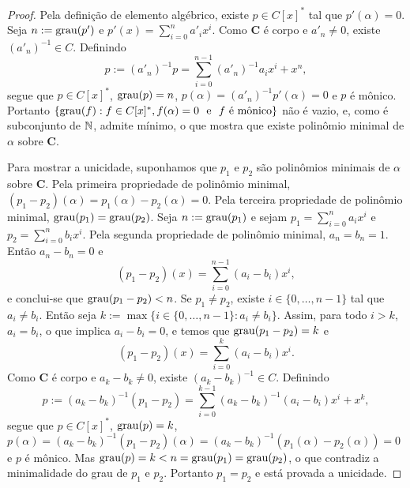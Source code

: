 \begin{proof}
	Pela definição de elemento algébrico, existe $p \in C[x]^*$ tal que $p'(\alpha)=0$. Seja $n := \operatorname{grau}(p')$ e $p'(x) = \sum_{i=0}^n a'_ix^i$. Como $\bm C$ é corpo e $a'_n \neq 0$, existe $(a'_n)^{-1} \in C$. Definindo
	\begin{equation*}
	p := (a'_n)^{-1}p = \sum_{i=0}^{n-1} (a'_n)^{-1}a_ix^i + x^n,
	\end{equation*}
segue que $p \in C[x]^*$, $\operatorname{grau}(p)=n$, $p(\alpha) = (a'_n)^{-1}p'(\alpha)=0$ e $p$ é mônico. Portanto $\{\operatorname{grau}(f) : f \in C[x]^*, f(\alpha)=0 \text{\ \ e\ \ } f \text{\ é mônico}\}$ não é vazio, e, como é subconjunto de $\mathbb{N}$, admite mínimo, o que mostra que existe polinômio minimal de $\alpha$ sobre $\bm C$.

	Para mostrar a unicidade, suponhamos que $p_1$ e $p_2$ são polinômios minimais de $\alpha$ sobre $\bm C$. Pela primeira propriedade de polinômio minimal, $(p_1-p_2)(\alpha)=p_1(\alpha)-p_2(\alpha)=0$. Pela terceira propriedade de polinômio minimal, $\operatorname{grau}(p_1)=\operatorname{grau}(p_2)$. Seja $n := \operatorname{grau}(p_1)$ e sejam $p_1 = \sum_{i=0}^n a_ix^i$ e $p_2 = \sum_{i=0}^n b_ix^i$. Pela segunda propriedade de polinômio minimal, $a_n=b_n=1$. Então $a_n-b_n=0$ e
	\begin{equation*}
	(p_1-p_2)(x) = \sum_{i=0}^{n-1} (a_i-b_i)x^i,
	\end{equation*}
e conclui-se que $\operatorname{grau}(p_1-p_2) < n$. Se $p_1 \neq p_2$, existe $i \in \{0,\ldots,n-1\}$ tal que $a_i \neq b_i$. Então seja $k := \max\{i \in \{0,\ldots,n-1\} : a_i \neq b_i\}$. Assim, para todo $i > k$, $a_i = b_i$, o que implica $a_i-b_i=0$, e temos que $\operatorname{grau}(p_1-p_2)=k$ e
	\begin{equation*}
	(p_1-p_2)(x) = \sum_{i=0}^{k} (a_i-b_i)x^i.
	\end{equation*}
Como $\bm C$ é corpo e $a_k-b_k \neq 0$, existe $(a_k-b_k)^{-1} \in C$. Definindo
	\begin{equation*}
	p := (a_k-b_k)^{-1}(p_1-p_2) = \sum_{i=0}^{k-1} (a_k-b_k)^{-1}(a_i-b_i)x^i + x^k,
	\end{equation*}
 segue que $p \in C[x]^*$, $\operatorname{grau}(p)=k$, $p(\alpha)=(a_k-b_k)^{-1}(p_1-p_2)(\alpha)=(a_k-b_k)^{-1}(p_1(\alpha)-p_2(\alpha))=0$ e $p$ é mônico. Mas $\operatorname{grau}(p) = k < n = \operatorname{grau}(p_1) = \operatorname{grau}(p_2)$, o que contradiz a minimalidade do grau de $p_1$ e $p_2$. Portanto $p_1=p_2$ e está provada a unicidade.
\end{proof}

